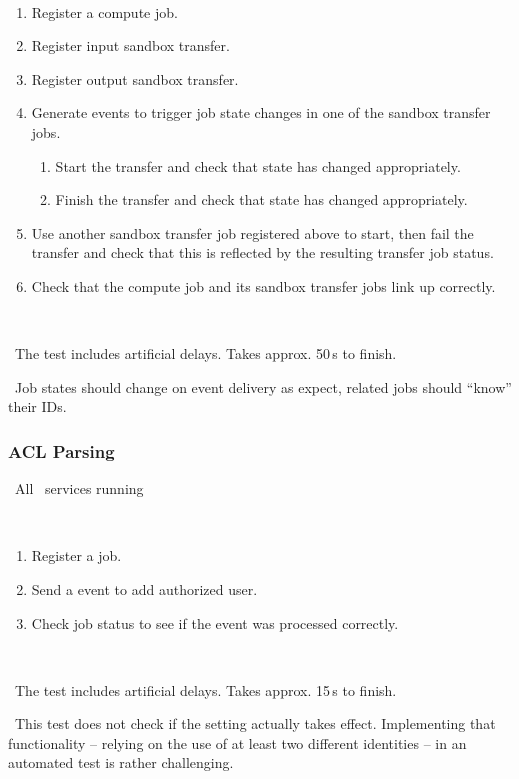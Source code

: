 \what\
\begin{enumerate}
\item Register a compute job.
\item Register input sandbox transfer.
\item Register output sandbox transfer.
\item Generate events to trigger job state changes in one of the sandbox transfer jobs.
	\begin{enumerate}
        \item Start the transfer and check that state has changed appropriately.
        \item Finish the transfer and check that state has changed appropriately. 
	\end{enumerate}
\item Use another sandbox transfer job registered above to start, then fail the transfer and check that this is reflected by the resulting transfer job status. 
\item Check that the compute job and its sandbox transfer jobs link up correctly. 

\end{enumerate}

\how\ 

\note\ The test includes artificial delays. Takes approx. 50\,s to finish.

\result\ Job states should change on event delivery as expect, related jobs should ``know'' their IDs.

\subsubsection{ACL Parsing}

\req\ All \LB\ services running

\what\
\begin{enumerate}
\item Register a job.
\item Send a  event to add authorized user.
\item Check job status to see if the event was processed correctly.
\end{enumerate}

\how\ 

\note\ The test includes artificial delays. Takes approx. 15\,s to finish.

\note\ This test does not check if the setting actually takes effect. Implementing that functionality -- relying on the use of at least two different identities -- in an automated test is rather challenging. 

